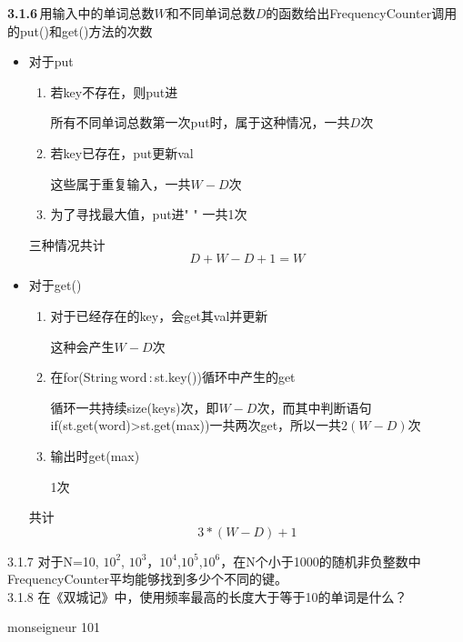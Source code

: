\documentclass[14pt,a4paper]{article}  %
\begin{document}
\begin{CJK*}{UTF8}{song}   %
\CJKtilde
\CJKindent

\textbf{3.1.6}\,用输入中的单词总数$W$和不同单词总数$D$的函数给出FrequencyCounter调用的put()和get()方法的次数

\begin{itemize}
	\item 对于put
	\begin{enumerate}
		\item 若key不存在，则put进

		所有不同单词总数第一次put时，属于这种情况，一共$D$次

		\item 若key已存在，put更新val

		这些属于重复输入，一共$W-D$次

		\item 为了寻找最大值，put进" "
		一共1次

	\end{enumerate}

	三种情况共计$$D + W - D + 1 = W$$

	\item 对于get()

	\begin{enumerate}
		\item 对于已经存在的key，会get其val并更新

		这种会产生$W - D$次

		\item 在for(String\,word\,:\,st.key())循环中产生的get

		循环一共持续size(keys)次，即$W-D$次，而其中判断语句if(st.get(word)>st.get(max))一共两次get，所以一共$2\left(W-D\right)$次

		\item 输出时get(max)

		1次
	\end{enumerate}

	共计$$ 3 * \left( W - D \right) + 1$$

\end{itemize}

3.1.7 对于N=10, $10^2$, $10^3$，$10^4$,$10^5$,$10^6$，在N个小于1000的随机非负整数中FrequencyCounter平均能够找到多少个不同的键。\\

3.1.8 在《双城记》中，使用频率最高的长度大于等于10的单词是什么？

monseigneur 101\\


\end{CJK*}
\end{document}
